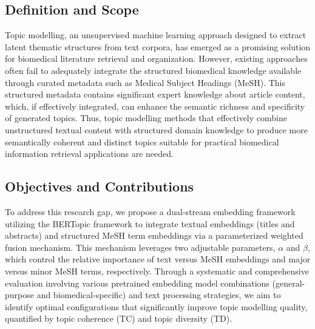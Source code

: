 \documentclass{ieeeaccess}
\begin{document}
\subsection{Definition and Scope}
Topic modelling, an unsupervised machine learning approach designed to extract latent thematic structures from text corpora, has emerged as a promising solution for biomedical literature retrieval and organization. However, existing approaches often fail to adequately integrate the structured biomedical knowledge available through curated metadata such as Medical Subject Headings (MeSH). This structured metadata contains significant expert knowledge about article content, which, if effectively integrated, can enhance the semantic richness and specificity of generated topics. Thus, topic modelling methods that effectively combine unstructured textual content with structured domain knowledge to produce more semantically coherent and distinct topics suitable for practical biomedical information retrieval applications are needed.

\subsection{Objectives and Contributions}
To address this research gap, we propose a dual-stream embedding framework utilizing the BERTopic framework to integrate textual embeddings (titles and abstracts) and structured MeSH term embeddings via a parameterized weighted fusion mechanism. This mechanism leverages two adjustable parameters, $\alpha$ and $\beta$, which control the relative importance of text versus MeSH embeddings and major versus minor MeSH terms, respectively. Through a systematic and comprehensive evaluation involving various pretrained embedding model combinations (general-purpose and biomedical-specific) and text processing strategies, we aim to identify optimal configurations that significantly improve topic modelling quality, quantified by topic coherence (TC) and topic diversity (TD).
\end{document}
